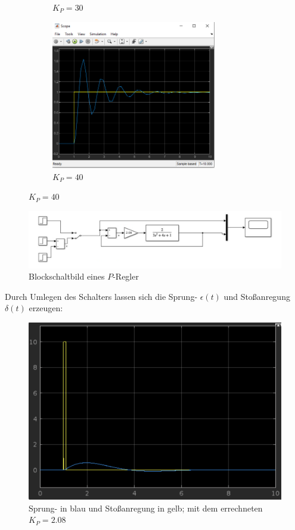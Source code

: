 \documentclass{article}
\begin{document}
\begin{figure}[h]
\begin{subfigure}{0.5\textwidth}
				\caption{$K_P = 30$}
				\label{fig:KP_30}
			\end{subfigure}
			\begin{subfigure}{0.5\textwidth}
				\includegraphics[width=1\linewidth, height=6.5cm]{2_3c/40.png}
				\caption{$K_P = 40$}
				\label{fig:KP_40}
			\end{subfigure}
			\label{fig:image2}
		\end{figure}
\newpage
\newpage
		\begin{figure}[h]
				\includegraphics[scale=0.35, center]{2_3c/3_c_Regelkreis.png}
				\caption{Blockschaltbild eines $P$-Regler}
				\label{fig31: Blockschaltbild}
			\end{figure}
			Durch Umlegen des Schalters lassen sich die Sprung- $\epsilon (t)$ und Stoßanregung $\delta (t)$ erzeugen:
\vspace{4mm}
			\begin{figure}[h]
				\includegraphics[scale=0.265, center]{Sprungantwort.png}
				\caption{Sprung- in blau und Stoßanregung in gelb; mit dem errechneten $K_P = 2.08$}
				\label{fig32: Sprung. und Stoßantwort}
			\end{figure}
\end{document}
